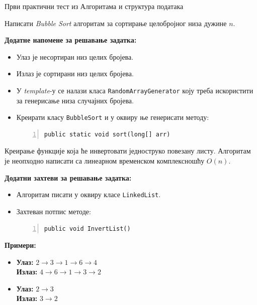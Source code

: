 
Први практични тест из Алгоритама и структура података

Написати \textit{Bubble Sort} алгоритам за сортирање целобројног низа дужине $n$.

\textbf{Додатне напомене за решавање задатка:}
\begin{itemize}
    \item Улаз је несортиран низ целих бројева.
    \item Излаз је сортирани низ целих бројева.
    \item У \textit{template}-у се налази класа \texttt{RandomArrayGenerator} коју треба искористити за генерисање низа случајних бројева.
    \item Креирати класу \texttt{BubbleSort} и у оквиру ње генерисати методу:
    \begin{Verbatim}[fontsize=\footnotesize, numbers=left, xleftmargin=10mm]
public static void sort(long[] arr)
    \end{Verbatim}
\end{itemize}



Креирање функције која ће инвертовати једноструко повезану листу. Алгоритам је неопходно написати са линеарном временском комплексношћу $O(n)$.

\textbf{Додатни захтеви за решавање задатка:}
\begin{itemize}
    \item Алгоритам писати у оквиру класе \texttt{LinkedList}.
    \item Захтеван потпис методе:
    \begin{Verbatim}[fontsize=\footnotesize, numbers=left, xleftmargin=10mm]
public void InvertList()
    \end{Verbatim}
\end{itemize}

\textbf{Примери:}
\begin{itemize}
    \item \textbf{Улаз:} $2 \rightarrow 3 \rightarrow 1 \rightarrow 6 \rightarrow 4$ \\
          \textbf{Излаз:} $4 \rightarrow 6 \rightarrow 1 \rightarrow 3 \rightarrow 2$
    \item \textbf{Улаз:} $2 \rightarrow 3$ \\
          \textbf{Излаз:} $3 \rightarrow 2$
\end{itemize}



